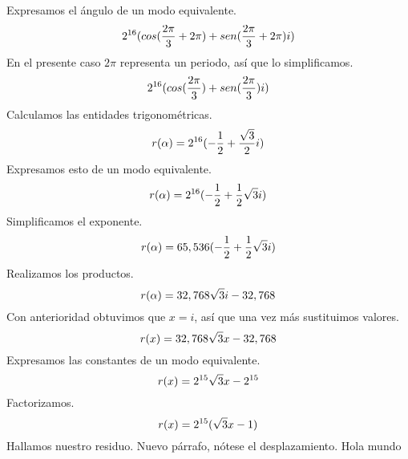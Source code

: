 \documentclass[letterpaper, 10pt]{article}
\begin{document}
    Expresamos el ángulo de un modo equivalente.
    \begin{equation} \notag 2^{16}(cos(\frac{2\pi}{3}+2\pi)+sen(\frac{2\pi}{3}+2\pi)i) \end{equation}
    En el presente caso $2\pi$ representa un periodo, así que lo simplificamos.
    \begin{equation} \notag 2^{16}(cos(\frac{2\pi}{3})+sen(\frac{2\pi}{3})i) \end{equation}
    Calculamos las entidades trigonométricas.
    \begin{equation} \notag r(\alpha)=2^{16}(-\frac{1}{2}+\frac{\sqrt{3}}{2}i) \end{equation}
    Expresamos esto de un modo equivalente.
    \begin{equation} \notag r(\alpha)=2^{16}(-\frac{1}{2}+\frac{1}{2} \sqrt{3} i) \end{equation}
    Simplificamos el exponente.
    \begin{equation} \notag r(\alpha)=65,536(-\frac{1}{2}+\frac{1}{2} \sqrt{3} i) \end{equation}
    Realizamos los productos.
    \begin{equation} \notag r(\alpha)=32,768 \sqrt{3} i -32,768 \end{equation}
    Con anterioridad obtuvimos que $x=i$, así que una vez más sustituimos valores.
    \begin{equation} \notag r(x)=32,768 \sqrt{3} x-32,768 \end{equation}
    Expresamos las constantes de un modo equivalente.
    \begin{equation} \notag r(x)=2^{15} \sqrt{3} x-2^{15} \end{equation}
    Factorizamos.
    \begin{equation} \notag r(x)= 2^{15} (\sqrt{3}x - 1) \end{equation}
    Hallamos nuestro residuo.
    \newpage
    Nuevo párrafo, nótese el desplazamiento. %
    Hola mundo
\end{document}
